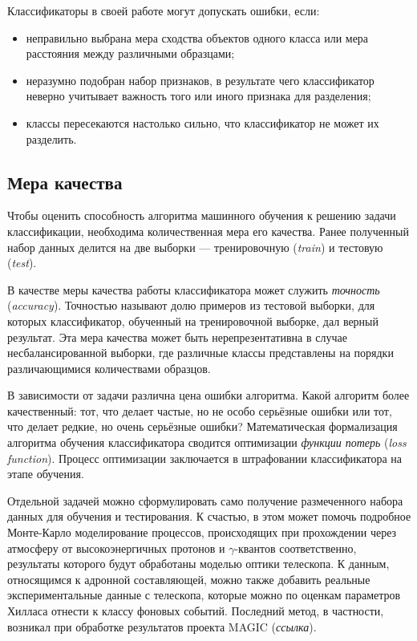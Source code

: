 \documentclass[magd,floatypics,numeref]{msudipl} %
\begin{document}
Классификаторы в своей работе могут допускать ошибки, если:
\begin{itemize}
\item неправильно выбрана мера сходства объектов одного класса или мера расстояния между различными образцами;
\item неразумно подобран набор признаков, в результате чего классификатор неверно учитывает важность того или иного признака для разделения;
\item классы пересекаются настолько сильно, что классификатор не может их разделить.
\end{itemize}
\subsection{Мера качества}
Чтобы оценить способность алгоритма машинного обучения к решению задачи классификации, необходима количественная мера его качества. Ранее полученный набор данных делится на две выборки --- тренировочную (\textit{train}) и тестовую (\textit{test}). 

В качестве меры качества работы классификатора может служить \textit{точность} (\textit{accuracy}). Точностью называют долю примеров из тестовой выборки, для которых классификатор, обученный на тренировочной выборке, дал верный результат.  Эта мера качества может быть нерепрезентативна в случае несбалансированной выборки, где различные классы представлены на порядки различающимися количествами образцов. 

В зависимости от задачи различна цена ошибки алгоритма. Какой алгоритм более качественный: тот, что делает частые, но не особо серьёзные ошибки или тот, что делает редкие, но очень серьёзные ошибки? Математическая формализация алгоритма обучения классификатора сводится оптимизации \textit{функции потерь} (\textit{loss function}). Процесс оптимизации заключается в штрафовании классификатора на этапе обучения.

Отдельной задачей можно сформулировать само получение размеченного набора данных для обучения и тестирования. К счастью, в этом может помочь подробное Монте-Карло моделирование процессов, происходящих при прохождении через атмосферу от высокоэнергичных протонов и $\gamma$-квантов соответственно, результаты которого будут обработаны моделью оптики телескопа. К данным, относящимся к адронной составляющей, можно также добавить реальные экспериментальные данные с телескопа, которые можно по оценкам параметров Хилласа отнести к классу фоновых событий. Последний метод, в частности, возникал при обработке результатов проекта MAGIC (\textit{ссылка}).
\end{document}
